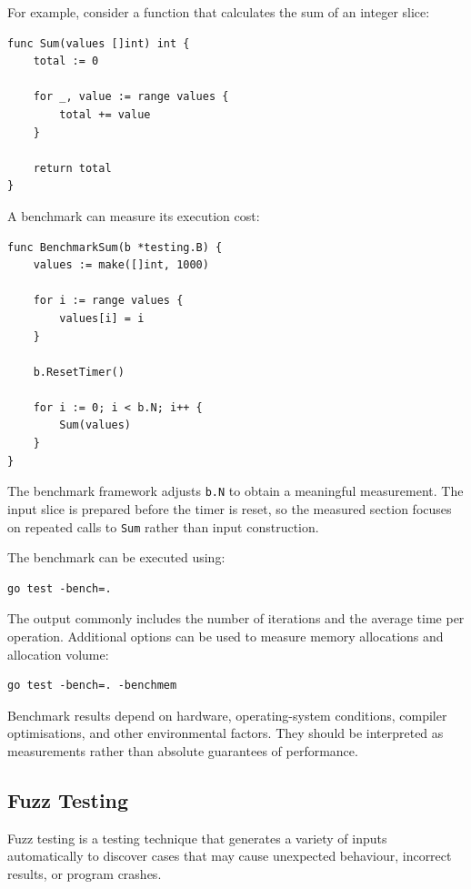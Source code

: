 For example, consider a function that calculates the sum of an integer slice:

\begin{lstlisting}
func Sum(values []int) int {
    total := 0

    for _, value := range values {
        total += value
    }

    return total
}
\end{lstlisting}

A benchmark can measure its execution cost:

\begin{lstlisting}
func BenchmarkSum(b *testing.B) {
    values := make([]int, 1000)

    for i := range values {
        values[i] = i
    }

    b.ResetTimer()

    for i := 0; i < b.N; i++ {
        Sum(values)
    }
}
\end{lstlisting}

The benchmark framework adjusts \texttt{b.N} to obtain a meaningful measurement. The input slice is prepared before the timer is reset, so the measured section focuses on repeated calls to \texttt{Sum} rather than input construction.

The benchmark can be executed using:

\begin{lstlisting}
go test -bench=.
\end{lstlisting}

The output commonly includes the number of iterations and the average time per operation. Additional options can be used to measure memory allocations and allocation volume:

\begin{lstlisting}
go test -bench=. -benchmem
\end{lstlisting}

Benchmark results depend on hardware, operating-system conditions, compiler optimisations, and other environmental factors. They should be interpreted as measurements rather than absolute guarantees of performance.

\subsection{Fuzz Testing}

Fuzz testing is a testing technique that generates a variety of inputs automatically to discover cases that may cause unexpected behaviour, incorrect results, or program crashes.

